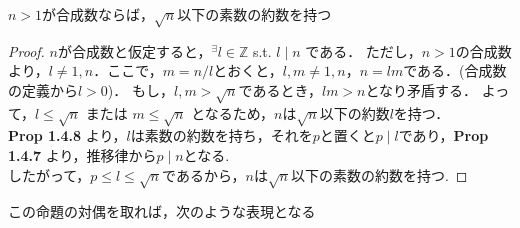 



% 

    \begin{prop}
      $n>1$が合成数ならば，$\sqrt{n}$以下の素数の約数を持つ
    \end{prop}

    \begin{proof}
      $n$が合成数と仮定すると，$^{\exists}l \in \mathbb{Z}$ s.t. $l \mid n$ である．
      ただし，$n>1$の合成数より，$ l \neq 1, n$．ここで，$m=n/l$とおくと，$l,m \neq 1,n$，$n = lm$である．(合成数の定義から$l>0$)．
      もし，$l,m > \sqrt{n}$であるとき，$lm > n$となり矛盾する．
      よって，$l \leq \sqrt{n}$ または $m \leq \sqrt{n}$ となるため，$n$は$\sqrt{n}$以下の約数$l$を持つ． \\
      \textbf{Prop 1.4.8} より，$l$は素数の約数を持ち，それを$p$と置くと$ p \mid l$であり，\textbf{Prop 1.4.7} より，推移律から$p \mid n$となる. \\
      したがって，$p \leq l \leq \sqrt{n}$であるから，$n$は$\sqrt{n}$以下の素数の約数を持つ.
    \end{proof}

    この命題の対偶を取れば，次のような表現となる

